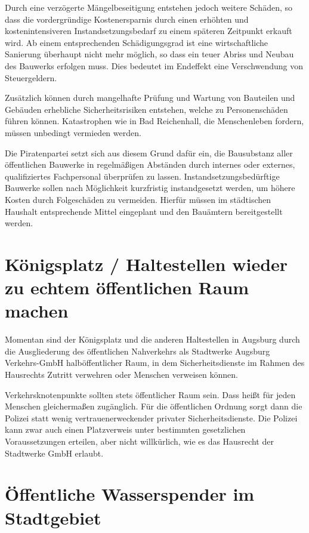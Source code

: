   Durch eine verzögerte Mängelbeseitigung entstehen jedoch weitere Schäden, so 
  dass die vordergründige Kostenersparnis durch einen erhöhten und 
  kostenintensiveren Instandsetzungsbedarf zu einem späteren Zeitpunkt erkauft 
  wird. Ab einem entsprechenden Schädigungsgrad ist eine wirtschaftliche 
  Sanierung überhaupt nicht mehr möglich, so dass ein teuer Abriss und Neubau 
  des Bauwerks erfolgen muss. Dies bedeutet im Endeffekt eine Verschwendung 
  von Steuergeldern.
  
  Zusätzlich können durch mangelhafte Prüfung und Wartung von Bauteilen und 
  Gebäuden erhebliche Sicherheitsrisiken entstehen, welche zu Personenschäden 
  führen können. Katastrophen wie in Bad Reichenhall, die Menschenleben 
  fordern, müssen unbedingt vermieden werden.
  
  Die Piratenpartei setzt sich aus diesem Grund dafür ein, die Bausubstanz 
  aller öffentlichen Bauwerke in regelmäßigen Abständen durch internes oder 
  externes, qualifiziertes Fachpersonal überprüfen zu lassen. 
  Instandsetzungsbedürftige Bauwerke sollen nach Möglichkeit kurzfristig 
  instandgesetzt werden, um höhere Kosten durch Folgeschäden zu vermeiden. 
  Hierfür müssen im städtischen Haushalt entsprechende Mittel eingeplant und 
  den Bauämtern bereitgestellt werden.
  
  \section{Königsplatz / Haltestellen wieder zu echtem öffentlichen Raum 
  machen}
  
  Momentan sind der Königsplatz und die anderen Haltestellen in Augsburg durch 
  die Ausgliederung des öffentlichen Nahverkehrs als Stadtwerke Augsburg 
  Verkehrs-GmbH halböffentlicher Raum, in dem Sicherheitsdienste im Rahmen des 
  Hausrechts Zutritt verwehren oder Menschen verweisen können.
  
  Verkehrsknotenpunkte sollten stets öffentlicher Raum sein. Dass heißt für 
  jeden Menschen gleichermaßen zugänglich. Für die öffentlichen Ordnung sorgt 
  dann die Polizei statt wenig vertrauenerweckender privater 
  Sicherheitsdienste. Die Polizei kann zwar auch einen Platzverweis unter 
  bestimmten gesetzlichen Voraussetzungen erteilen, aber nicht willkürlich, 
  wie es das Hausrecht der Stadtwerke GmbH erlaubt.
  
  \section{Öffentliche Wasserspender im Stadtgebiet}
  
